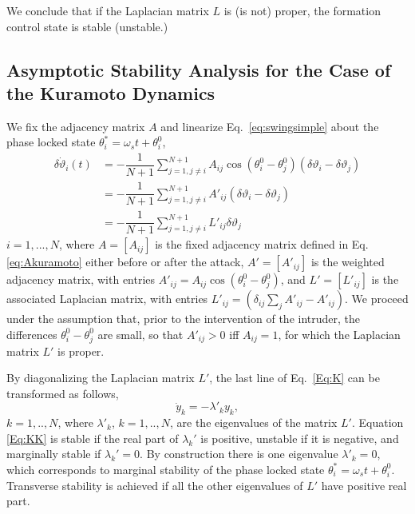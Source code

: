 \documentclass[%
 reprint,
 amsmath,amssymb,
 aip,
]{revtex4-2}
\theoremstyle{italichead}
\theoremstyle{definition}
\begin{document}
{We conclude that if the Laplacian matrix $L$ is (is not) proper, the formation control state is stable (unstable.) 


\subsection{Asymptotic Stability Analysis for the Case of the Kuramoto Dynamics \label{Sec:MAIIII}}

We fix the adjacency matrix $A$ and linearize Eq.\  \eqref{eq:swingsimple} about the phase locked state $\theta_i^*= \omega_s t+ \theta_i^0$,
\begin{equation} \label{Eq:K}
\begin{aligned}
     \delta \dot{\vartheta}_i (t) &= -\dfrac{1}{N+1} \sum_{j=1, j \neq i}^{N+1}  A_{ij} \cos(\theta_i^0 - \theta_j^0) (\delta \vartheta_i-\delta \vartheta_j)\\
     &=  -\dfrac{1}{N+1} \sum_{j=1, j \neq i}^{N+1}  A'_{ij}  (\delta \vartheta_i-\delta \vartheta_j)\\
     &= -\dfrac{1}{N+1}  \sum_{j= 1, j \neq i}^{N+1} L'_{ij}  \delta \vartheta_j
     \end{aligned}
     \end{equation}
$i=1,...,N$, where  $A=[A_{ij}]$ is the fixed adjacency matrix defined in Eq. \eqref{eq:Akuramoto} either before or after the attack, $A'=[A'_{ij}]$ is the weighted adjacency matrix,
with entries $A'_{ij}= A_{ij} \cos(\theta_i^0 - \theta_j^0)$, and $L'=[L'_{ij}]$ is the associated Laplacian matrix, with entries $L'_{ij}= (\delta_{ij} \sum_j A'_{ij}  - A'_{ij})$. We proceed under the assumption that, prior to the intervention of the intruder, the differences $\theta_i^0 - \theta_j^0$ are small, so that  $A'_{ij}>0$ iff $A_{ij}=1$, for which the Laplacian matrix $L'$ is proper.

By diagonalizing the Laplacian matrix $L'$, the last line of Eq.\ \eqref{Eq:K} can be transformed as follows,
\begin{equation} \label{Eq:KK}
    \dot{y}_k= - \lambda'_{k}  y_k,
\end{equation}
$k=1,..,N$, where $\lambda'_{k}$, $k=1,..,N$,  are the eigenvalues of the matrix $L'$. Equation \eqref{Eq:KK} is stable if the real part of $\lambda_k'$ is positive, unstable if it is negative, and marginally stable if $\lambda_k'=0$. By construction there is one eigenvalue $\lambda'_{k}=0$, which corresponds to marginal stability of the phase locked state $\theta_i^*= \omega_s t+ \theta_i^0$. Transverse stability is achieved if all the other eigenvalues of $L'$ have positive real part. 

}
\end{document}
